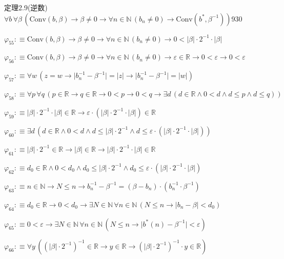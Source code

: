 \begin{fullproof}{定理2.9(逆数)}{$\forall b\,\forall \beta\,(\mathrm{Conv}(b,\beta) \to \beta \neq 0 \to \forall n \in \mathbb{N}\,(b_{n} \neq 0) \to \mathrm{Conv}(b^{\ast},\beta^{-1}))$}{930}
\begin{abbrevlist}
\item $\varphi_{55} :\equiv \mathrm{Conv}(b,\beta) \to \beta \neq 0 \to \forall n \in \mathbb{N}\,(b_{n} \neq 0) \to 0 < \lvert \beta \rvert \cdot 2^{-1} \cdot \lvert \beta \rvert$
\item $\varphi_{56} :\equiv \mathrm{Conv}(b,\beta) \to \beta \neq 0 \to \forall n \in \mathbb{N}\,(b_{n} \neq 0) \to \varepsilon \in \mathbb{R} \to 0 < \varepsilon \to 0 < \varepsilon$
\item $\varphi_{57} :\equiv \forall w\,(z = w \to \lvert b_{n}^{-1} - \beta^{-1} \rvert = \lvert z \rvert \to \lvert b_{n}^{-1} - \beta^{-1} \rvert = \lvert w \rvert)$
\item $\varphi_{58} :\equiv \forall p\,\forall q\,(p \in \mathbb{R} \to q \in \mathbb{R} \to 0 < p \to 0 < q \to \exists d\,(d \in \mathbb{R} \land 0 < d \land d \leq p \land d \leq q))$
\item $\varphi_{59} :\equiv \lvert \beta \rvert \cdot 2^{-1} \cdot \lvert \beta \rvert \in \mathbb{R} \to \varepsilon \cdot (\lvert \beta \rvert \cdot 2^{-1} \cdot \lvert \beta \rvert) \in \mathbb{R}$
\item $\varphi_{60} :\equiv \exists d\,(d \in \mathbb{R} \land 0 < d \land d \leq \lvert \beta \rvert \cdot 2^{-1} \land d \leq \varepsilon \cdot (\lvert \beta \rvert \cdot 2^{-1} \cdot \lvert \beta \rvert))$
\item $\varphi_{61} :\equiv \lvert \beta \rvert \cdot 2^{-1} \in \mathbb{R} \to \lvert \beta \rvert \in \mathbb{R} \to \lvert \beta \rvert \cdot 2^{-1} \cdot \lvert \beta \rvert \in \mathbb{R}$
\item $\varphi_{62} :\equiv d_{0} \in \mathbb{R} \land 0 < d_{0} \land d_{0} \leq \lvert \beta \rvert \cdot 2^{-1} \land d_{0} \leq \varepsilon \cdot (\lvert \beta \rvert \cdot 2^{-1} \cdot \lvert \beta \rvert)$
\item $\varphi_{63} :\equiv n \in \mathbb{N} \to N \leq n \to b_{n}^{-1} - \beta^{-1} = (\beta - b_{n}) \cdot (b_{n}^{-1} \cdot \beta^{-1})$
\item $\varphi_{64} :\equiv d_{0} \in \mathbb{R} \to 0 < d_{0} \to \exists N \in \mathbb{N}\,\forall n \in \mathbb{N}\,(N \leq n \to \lvert b_{n} - \beta \rvert < d_{0})$
\item $\varphi_{65} :\equiv 0 < \varepsilon \to \exists N \in \mathbb{N}\,\forall n \in \mathbb{N}\,(N \leq n \to \lvert b^{\ast}(n) - \beta^{-1} \rvert < \varepsilon)$
\item $\varphi_{66} :\equiv \forall y\,((\lvert \beta \rvert \cdot 2^{-1})^{-1} \in \mathbb{R} \to y \in \mathbb{R} \to (\lvert \beta \rvert \cdot 2^{-1})^{-1} \cdot y \in \mathbb{R})$

\end{abbrevlist}
\end{fullproof}
